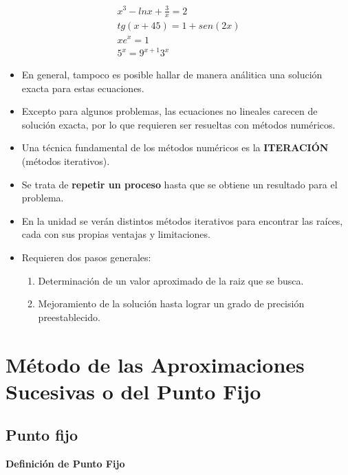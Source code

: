 \documentclass[]{book}
\providecommand{\tightlist}{%
  \setlength{\itemsep}{0pt}\setlength{\parskip}{0pt}}
\begin{document}
\begin{gather*}
x^3 - ln x + \frac{3}{x} = 2 \\
tg(x + 45) = 1 + sen(2x) \\
xe^{x}=1 \\
{\displaystyle 5^{x}=9^{x+1} 3^{x}}
\end{gather*}

\begin{itemize}
\item
  En general, tampoco es posible hallar de manera análitica una solución exacta para estas ecuaciones.
\item
  Excepto para algunos problemas, las ecuaciones no lineales carecen de solución exacta, por lo que requieren ser resueltas con métodos numéricos.
\item
  Una técnica fundamental de los métodos numéricos es la \textbf{ITERACIÓN} (métodos iterativos).
\item
  Se trata de \textbf{repetir un proceso} hasta que se obtiene un resultado para el problema.
\item
  En la unidad se verán distintos métodos iterativos para encontrar las raíces, cada con sus propias ventajas y limitaciones.
\item
  Requieren dos pasos generales:

  \begin{enumerate}
  \def\labelenumi{\arabic{enumi}.}
  \tightlist
  \item
    Determinación de un valor aproximado de la raiz que se busca.
  \item
    Mejoramiento de la solución hasta lograr un grado de precisión preestablecido.
  \end{enumerate}
\end{itemize}

\hypertarget{muxe9todo-de-las-aproximaciones-sucesivas-o-del-punto-fijo}{%
\section{Método de las Aproximaciones Sucesivas o del Punto Fijo}\label{muxe9todo-de-las-aproximaciones-sucesivas-o-del-punto-fijo}}

\hypertarget{punto-fijo}{%
\subsection{Punto fijo}\label{punto-fijo}}

\textbf{Definición de Punto Fijo}
\end{document}
